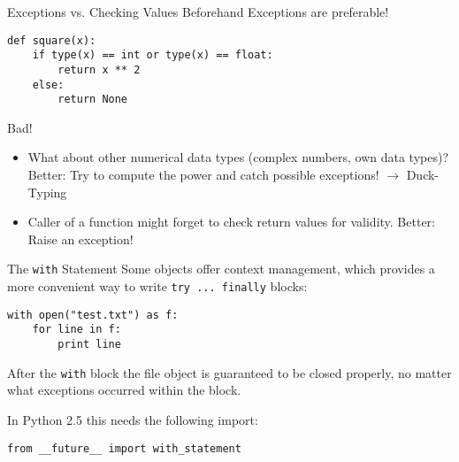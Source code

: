 \begin{frame}[fragile]{Exceptions vs. Checking Values Beforehand}
Exceptions are preferable!

\begin{lstlisting}
def square(x):
    if type(x) == int or type(x) == float:
        return x ** 2
    else:
        return None
\end{lstlisting}
Bad!

\begin{itemize}
  \item What about other numerical data types (complex numbers, own data types)? Better: Try to compute the power and catch possible exceptions! $\rightarrow$ \alert{Duck-Typing}

  \item Caller of a function might forget to check return values for validity. Better: Raise an exception!
\end{itemize}
\end{frame}


\begin{frame}[fragile]{The \texttt{with} Statement}
Some objects offer context management, which provides a more convenient way to write \lstinline{try ... finally} blocks:
\begin{lstlisting}
with open("test.txt") as f:
    for line in f:
        print line
\end{lstlisting}
After the \lstinline{with} block the file object is guaranteed to be closed properly, no matter what exceptions occurred within the block.\vspace{5mm}

In Python 2.5 this needs the following import:
\begin{lstlisting}
from __future__ import with_statement
\end{lstlisting}
\end{frame}
